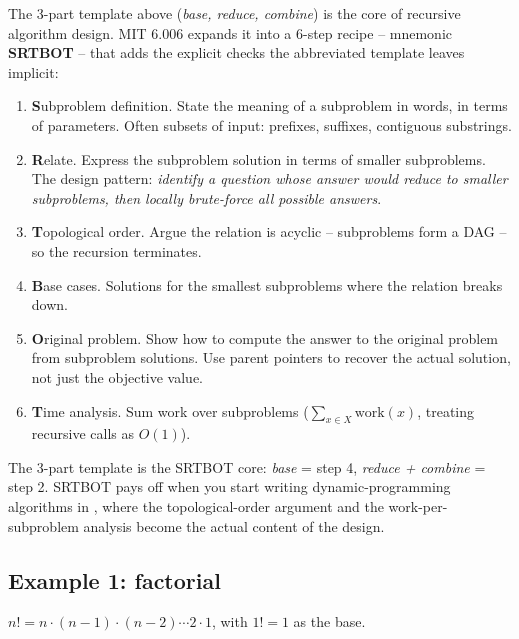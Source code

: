 \documentclass[11pt]{article}
\begin{document}
\begin{defnbox}
The 3-part template above (\emph{base, reduce, combine}) is the
core of recursive algorithm design. MIT 6.006 expands it into a
6-step recipe -- mnemonic \textbf{SRTBOT} -- that adds the explicit
checks the abbreviated template leaves implicit:

\begin{enumerate}[leftmargin=*,noitemsep]
    \item \textbf{S}ubproblem definition. State the meaning of a
          subproblem in words, in terms of parameters. Often
          subsets of input: prefixes, suffixes, contiguous
          substrings.
    \item \textbf{R}elate. Express the subproblem solution in terms
          of smaller subproblems. The design pattern: \emph{identify
          a question whose answer would reduce to smaller subproblems,
          then locally brute-force all possible answers}.
    \item \textbf{T}opological order. Argue the relation is
          acyclic -- subproblems form a DAG -- so the recursion
          terminates.
    \item \textbf{B}ase cases. Solutions for the smallest
          subproblems where the relation breaks down.
    \item \textbf{O}riginal problem. Show how to compute the answer
          to the original problem from subproblem solutions. Use
          parent pointers to recover the actual solution, not just
          the objective value.
    \item \textbf{T}ime analysis. Sum work over subproblems
          ($\sum_{x \in X} \text{work}(x)$, treating recursive
          calls as $O(1)$).
\end{enumerate}

The 3-part template is the SRTBOT core: \emph{base} = step 4,
\emph{reduce + combine} = step 2. SRTBOT pays off when you start
writing dynamic-programming algorithms in , where
the topological-order argument and the work-per-subproblem analysis
become the actual content of the design.
\end{defnbox}

\subsection{Example 1: factorial}

$n! = n \cdot (n-1) \cdot (n-2) \cdots 2 \cdot 1$, with $1! = 1$ as the
base.
\end{document}
